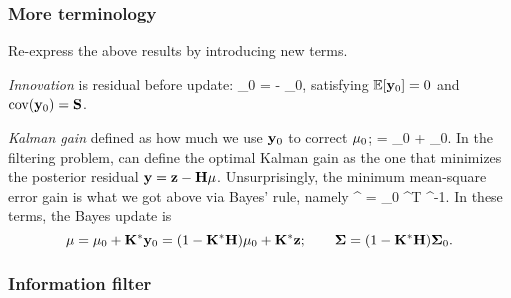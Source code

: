 \documentclass[notitlepage,openany,11pt]{report}
\DeclareMathOperator{\cov}{cov}
\theoremstyle{plain}%
\numberwithin{equation}{section}
\begin{document}
\subsubsection{More terminology}
Re-express the above results by introducing new terms. 

\emph{Innovation} is residual before update:
\be
{}_0 =  -  \mbf{\mu}_0,
\ee
satisfying $\mathbb{E}[\mathbf{y}_0] = 0$ and $\cov(\mbf{y}_0) = \mbf{S}$. 

\emph{Kalman gain} defined as how much we use $\mathbf{y}_0$ to correct $\mathbf{\mu}_{0}$;
\be
\mbf{\mu} = \mbf{\mu}_{0} +  _0.
\ee
In the filtering problem, can define the optimal Kalman gain as the one that minimizes the posterior residual $\mathbf{y} = \mathbf{z} - \mathbf{H} \mathbf{\mu}$. Unsurprisingly, the minimum mean-square error gain is what we got above via Bayes' rule, namely
\be
{}^{\ast} = \mbf{\Sigma}_0 ^{T} ^{-1}.
\ee
In these terms, the Bayes update is
\begin{equation}
\mathbf{\mu} = \mathbf{\mu}_0 + \mathbf{K}^{\ast} \mathbf{y}_0 = (1 - \mathbf{K}^{\ast} \mathbf{H})\mathbf{\mu}_0 + \mathbf{K}^{\ast}\mathbf{z}; \qquad \mathbf{\Sigma} = (1 - \mathbf{K}^{\ast} \mathbf{H}) \mathbf{\Sigma}_0.
\end{equation}

%
%
%


\subsubsection{Information filter}
\end{document}
